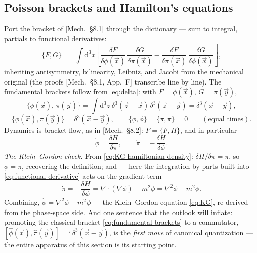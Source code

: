 \documentclass[11pt]{article}
\theoremstyle{plain}
\theoremstyle{definition}
\theoremstyle{remark}
\newcommand{\dd}{\mathrm{d}}
\newcommand{\ii}{\mathrm{i}}
\newcommand{\vx}{\vec{x}}
\begin{document}
\subsection{Poisson brackets and Hamilton's equations}
\label{sec:field-poisson}

Port the bracket of [Mech.\ \S8.1] through the dictionary --- sum to
integral, partials to functional derivatives:
\begin{equation}
  \{F, G\}
  \;=\;
  \int \dd^3x
  \left[
    \frac{\delta F}{\delta\phi(\vx)}\,
    \frac{\delta G}{\delta\pi(\vx)}
    -
    \frac{\delta F}{\delta\pi(\vx)}\,
    \frac{\delta G}{\delta\phi(\vx)}
  \right],
  \label{eq:field-bracket}
\end{equation}
inheriting antisymmetry, bilinearity, Leibniz, and Jacobi from the
mechanical original (the proofs [Mech.\ \S8.1, App.\ F] transcribe
line by line). The fundamental brackets follow from
\eqref{eq:delta}: with $F = \phi(\vx)$, $G = \pi(\vec y)$,
\begin{equation}
  \{\phi(\vx),\, \pi(\vec y)\}
  = \int\dd^3z\;
    \delta^3(\vec z - \vx)\,\delta^3(\vec z - \vec y)
  = \delta^3(\vx - \vec y),
\end{equation}
\begin{equation}
  \boxed{\;
  \{\phi(\vx), \pi(\vec y)\} = \delta^3(\vx - \vec y),
  \qquad
  \{\phi, \phi\} = \{\pi, \pi\} = 0
  \qquad(\text{equal times}).
  \;}
  \label{eq:fundamental-brackets}
\end{equation}
Dynamics is bracket flow, as in [Mech.\ \S8.2]:
$\dot F = \{F, H\}$, and in particular
\begin{equation}
  \dot\phi = \frac{\delta H}{\delta\pi} ,
  \qquad
  \dot\pi = -\,\frac{\delta H}{\delta\phi} .
  \label{eq:field-hamilton-eqs}
\end{equation}
\emph{The Klein--Gordon check.} From
\eqref{eq:KG-hamiltonian-density}: $\delta H/\delta\pi = \pi$, so
$\dot\phi = \pi$, recovering the definition; and --- here the
integration by parts built into \eqref{eq:functional-derivative}
acts on the gradient term ---
\begin{equation}
  \dot\pi
  = -\frac{\delta H}{\delta\phi}
  = \nabla\cdot(\nabla\phi) - m^2\phi
  = \nabla^2\phi - m^2\phi .
\end{equation}
Combining, $\ddot\phi = \nabla^2\phi - m^2\phi$ --- the Klein--Gordon
equation \eqref{eq:KG}, re-derived from the phase-space side. And one
sentence that the outlook will inflate: promoting the classical
bracket \eqref{eq:fundamental-brackets} to a commutator,
$[\hat\phi(\vx), \hat\pi(\vec y)] = \ii\,\delta^3(\vx - \vec y)$, is
the \emph{first move} of canonical quantization --- the entire
apparatus of this section is its starting point.
\end{document}
